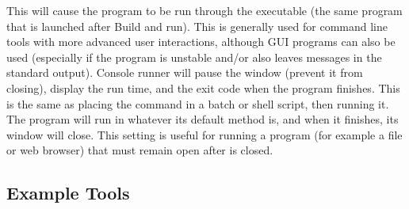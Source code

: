 

This will cause the program to be run through the executable  (the same program that is launched after Build and run). This is generally used for command line tools with more advanced user interactions, although GUI programs can also be used (especially if the program is unstable and/or also leaves messages in the standard output). Console runner will pause the window (prevent it from closing), display the run time, and the exit code when the program finishes.
This is the same as placing the command in a batch or shell script, then running it. The program will run in whatever its default method is, and when it finishes, its window will close. This setting is useful for running a program (for example a file or web browser) that must remain open after \codeblocks is closed.


\subsection{Example Tools}


